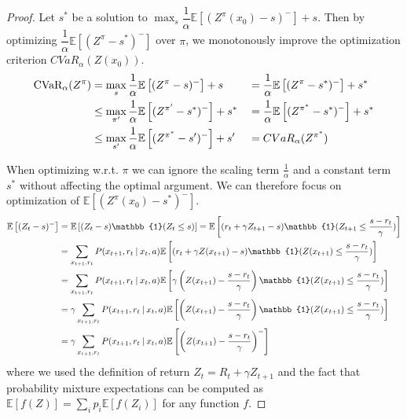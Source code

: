 \begin{proof}

Let $s^*$ be a solution to $\max_s \dfrac{1}{\alpha}\mathbb{E}\left[ (Z^\pi(x_0)-s)^-\right] + s$. Then by optimizing $\dfrac{1}{\alpha}\mathbb{E}
\left[ (Z^\pi-s^*)^-\right]$ over $\pi$, we monotonously improve the optimization criterion $CVaR_\alpha(Z(x_0))$.
\begin{align*}
\text{CVaR}_\alpha(Z^{\pi}) &= \max_{s}\dfrac{1}{\alpha}\mathbb{E}\left[ (Z^{\pi}-s)^-\right] + s &&= \dfrac{1}{\alpha}\mathbb{E}\left[ (Z^{\pi}-s^*)^-\right] + s^* \\
&\le \max_{\pi'}\dfrac{1}{\alpha}\mathbb{E} \left[ (Z^{\pi'}-s^*)^-\right] + s^* &&= \dfrac{1}{\alpha}\mathbb{E}\left[ (Z^{\pi^*}-s^*)^-\right] + s^*\\
 &\le \max_{s'}\dfrac{1}{\alpha}\mathbb{E}\left[ (Z^{\pi^*}-s')^-\right] + s' &&= CVaR_\alpha(Z^{\pi^*})
\end{align*}

When optimizing w.r.t. $\pi$ we can ignore the scaling term $\frac{1}{\alpha}$ and a constant term $s^*$ without affecting the optimal argument. We can therefore focus on optimization of $\mathbb{E}\left[ (Z^\pi(x_0)-s^*)^-\right]$.
\begin{equation}
\begin{split}
\mathbb{E}\left[(Z_t-s)^-\right] &= \mathbb{E}\left[(Z_t-s)\mathbb{1}(Z_t\le s)\right] = \mathbb{E}\left[(r_t + \gamma Z_{t+1}-s)\mathbb{1}(Z_{t+1}\le \dfrac{s - r_t}{\gamma})\right]\\
&= \sum_{x_{t+1}, r_t} P(x_{t+1}, r_t \given x_t, a)\mathbb{E}\left[(r_t + \gamma Z(x_{t+1})-s)\mathbb{1}(Z(x_{t+1})\le \dfrac{s - r_t}{\gamma})\right]\\
&= \sum_{x_{t+1}, r_t} P(x_{t+1}, r_t \given x_t, a)\mathbb{E}\left[\gamma\left(Z(x_{t+1})-\dfrac{s-r_t}{\gamma}\right)\mathbb{1}(Z(x_{t+1})\le \dfrac{s - r_t}{\gamma})\right]\\
&= \gamma\sum_{x_{t+1}, r_t} P(x_{t+1}, r_t \given x_t, a)\mathbb{E}\left[\left(Z(x_{t+1})-\dfrac{s-r_t}{\gamma}\right)\mathbb{1}(Z(x_{t+1})\le \dfrac{s - r_t}{\gamma})\right]\\
&= \gamma\sum_{x_{t+1}, r_t} P(x_{t+1}, r_t \given x_t, a)\mathbb{E}\left[\left(Z(x_{t+1}) - \dfrac{s - r_t}{\gamma}\right)^-\right]
\end{split}
\end{equation}
where we used the definition of return $Z_t = R_t + \gamma Z_{t+1}$ and the fact that probability mixture expectations can be computed as $\mathbb{E}[f(Z)] = \sum_i p_i \mathbb{E}[f(Z_i)]$ for any function $f$.


\end{proof}

